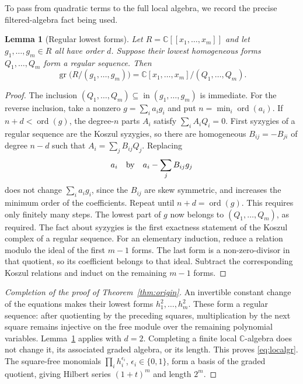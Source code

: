 \documentclass[11pt,a4paper]{article}
\newtheorem{lemma}{Lemma}[section]
\theoremstyle{definition}
\theoremstyle{remark}
\newcommand{\C}{\mathbb C}
\newcommand{\gr}{\operatorname{gr}}
\newcommand{\ini}{\operatorname{in}}
\begin{document}
To pass from quadratic terms to the full local algebra, we record the precise
filtered-algebra fact being used.
\begin{lemma}[Regular lowest forms]\label{lem:initial}
Let $R=\C[[x_1,\ldots,x_m]]$ and let $g_1,\ldots,g_m\in R$ all have order
$d$. Suppose their lowest homogeneous forms $Q_1,\ldots,Q_m$ form a regular
sequence. Then
\[
 \gr\bigl(R/(g_1,\ldots,g_m)\bigr)
       =\C[x_1,\ldots,x_m]/(Q_1,\ldots,Q_m).
\]
\end{lemma}
\begin{proof}
The inclusion $(Q_1,\ldots,Q_m)\subseteq\ini(g_1,\ldots,g_m)$ is immediate.
For the reverse inclusion, take a nonzero $g=\sum_i a_ig_i$ and put
$n=\min_i\operatorname{ord}(a_i)$. If $n+d<\operatorname{ord}(g)$, the
degree-$n$ parts $A_i$ satisfy $\sum_iA_iQ_i=0$. First syzygies of a regular
sequence are the Koszul syzygies, so there are homogeneous $B_{ij}=-B_{ji}$
of degree $n-d$ such that $A_i=\sum_jB_{ij}Q_j$. Replacing
\[
 a_i\quad\hbox{by}\quad a_i-\sum_jB_{ij}g_j
\]
does not change $\sum_i a_ig_i$, since the $B_{ij}$ are skew symmetric,
and increases the minimum order of the coefficients. Repeat until
$n+d=\operatorname{ord}(g)$. This requires only finitely many steps. The
lowest part of $g$ now belongs to $(Q_1,\ldots,Q_m)$, as required.
The fact about syzygies is the first exactness statement of the Koszul
complex of a regular sequence. For an elementary induction, reduce a relation
modulo the ideal of the first $m-1$ forms. The last form is a non-zero-divisor
in that quotient, so its coefficient belongs to that ideal. Subtract the
corresponding Koszul relations and induct on the remaining $m-1$ forms.
\end{proof}

\begin{proof}[Completion of the proof of Theorem~\ref{thm:origin}]
An invertible constant change of the equations makes their lowest forms
$h_1^2,\ldots,h_m^2$. These form a regular sequence: after quotienting by
the preceding squares, multiplication by the next square remains injective
on the free module over the remaining polynomial variables.
Lemma~\ref{lem:initial} applies with $d=2$. Completing a finite local
$\C$-algebra does not change it, its associated graded algebra, or its
length. This proves \eqref{eq:localgr}. The square-free monomials
$\prod_i h_i^{\epsilon_i}$, $\epsilon_i\in\{0,1\}$, form a basis of the
graded quotient, giving Hilbert series $(1+t)^m$ and length $2^m$.
\end{proof}
\end{document}
